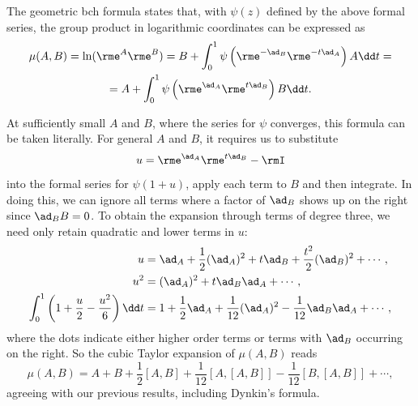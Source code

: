 \begin{thm}
The geometric \gls{bch} formula states that, with $\psi(z)$ defined by the above formal series, the group product in logarithmic coordinates can be expressed as
\begin{multline}
    \mu(A,B) =\ln(\rme^A\rme^B)=
    B+\int_0^1\psi\left(\rme^{-\ad_B}\rme^{-t\ad_A}\right)A\dd t=\\
    =A+\int_0^1\psi\left(\rme^{\ad_A}\rme^{t\ad_B}\right)B\dd t.\label{eq geom BCH}
\end{multline}
\end{thm}
At sufficiently small $A$ and $B$, where the series for $\psi$ converges, this formula can be taken literally. For general $A$ and $B$, it requires us to substitute 
\[u=\rme^{\ad_A}\rme^{t\ad_B}-\rmI\]
into the formal series for $\psi(1+u)$, apply each term to $B$ and then integrate. In doing this, we can ignore all terms where a factor of $\ad_B$ shows up on the right since $\ad_B B=0$. To obtain the expansion through terms of degree three, we need only retain quadratic and lower terms in $u$:
\begin{align}
    u  &=\ad_A+\frac12(\ad_A)^2+t\ad_B+\frac{t^2}{2}(\ad_B)^2+\cdots,\\
    u^2&=(\ad_A)^2+t\ad_B\ad_A+\cdots,\\
    \int_0^1\left(1+\frac u2-\frac{u^2}{6}\right)\dd t&= 1+\frac 12\ad_A+\frac{1}{12}(\ad_A)^2-\frac{1}{12}\ad_B \ad_A+\cdots,
\end{align}
where the dots indicate either higher order terms or terms with $\ad_B$ occurring on the right. So the cubic Taylor expansion of $\mu(A,B)$ reads
\[\mu(A,B)=A+B+\frac12[A,B]+\frac{1}{12}[A,[A,B]]-\frac{1}{12}[B,[A,B]]+\cdots,\]
agreeing with our previous results, including Dynkin's formula.

